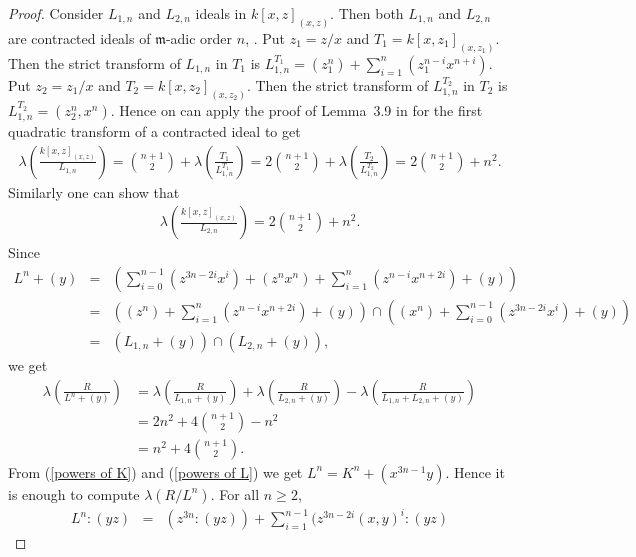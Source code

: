 \documentclass[reqno,a4paper,dvipsnames]{amsart}
\newcommand{\m}{\mathfrak{m} }
\theoremstyle{definition}
\begin{document}
\begin{proof}
    Consider  $L_{1,n}$ and $L_{2,n}$ ideals in $k[x,z]_{(x,z)}$. Then  both $L_{1,n}$ and $L_{2,n}$ are  contracted ideals of $\m$-adic order $n$,
    \cite[Proposition~2.3]{huneke-complete}. Put $z_1 = z/x$ and $T_1= k[x,z_1]_{(x,z_1)}$.
   Then   the strict transform of $L_{1,n}$  in $T_1$ is $L_{1,n}^{T_1} = (z_1 ^n) + \sum_{i=1}^{n} (z_1^{n-i} x^{n+i})$.  Put  $z_2 = z_1/x$ and $T_2= k[x,z_2]_{(x,z_2)}$.
   Then   the strict transform of $L_{1,n}^{T_2}$  in $T_2$ is $L_{1,n}^{T_2} = (z_2^n, x^n)$. 
Hence  on can apply the proof of  Lemma~3.9 in \cite{john-verma} for  the first quadratic transform of a contracted ideal to get
\begin{eqnarray*}
    \lambda \left( \frac{k[x,z]_{(x,z)}}{L_{1,n}}\right) 
=  \binom{n+1}{2} +  \lambda \left( \frac{T_1}{L_{1,n}^{T_1}}\right) 
= 2 \binom{n+1}{2} + \lambda \left( \frac{T_2}{L_{1,n}^{T_2}}\right) 
= 2 \binom{n+1}{2} + n^2.
 \end{eqnarray*}
Similarly one can show that 
 \begin{eqnarray*}
    \lambda \left( \frac{k[x,z]_{(x,z)}}{L_{2,n}}\right) 
     = 2 \binom{n+1}{2} + n^2.
    \end{eqnarray*}
    Since
 \begin{eqnarray}
    \label{formula L^n} \nonumber
  L^n + (y) 
 &=&\left(  \sum_{i=0}^{n-1} (z^{3n-2i} x^i)  + (z^n x^n) 
+     \sum_{i=1}^{n} (z^{n-i} x^{n+2i}) + (y) \right)
     \\ \nonumber
&=& \left(  (z^n)
 +    \sum_{i=1}^{n} (z^{n-i} x^{n+2i}) + (y) \right)
     \cap \left(  (x^n) +  \sum_{i=0}^{n-1} (z^{3n-2i} x^i) + (y) \right)\\ 
  &=&   (L_{1,n} +  (y) ) \cap (L_{2,n} + (y)),
      \end{eqnarray}
we get 
\begin{align}
\label{length ln+y}  \nonumber
    \lambda \left( \frac{R}{L^{n} + (y)} \right) 
    &= \lambda \left( \frac{R}{L_{1,n} + (y)} \right)  
    + \lambda \left( \frac{R}{L_{2,n} + (y)} \right) 
    - \lambda \left( \frac{R}{ L_{1,n} + L_{2,n} + (y)} \right)\\  \nonumber
    &= 2 n^2 + 4\binom{n+1}{2} - n^2\\
    &= n^2 +  4\binom{n+1}{2}.
\end{align}
     From  (\ref{powers of K}) and (\ref{powers of L}) we get $L^n = K^n + (x^{3n-1}y)$. Hence  it is enough to compute $\lambda(R/L^n)$. 
 For all $n \geq 2$,  \normalsize
\begin{eqnarray} \nonumber
     L^n : (yz) 
     &=& (z^{3n} :(yz)) + \sum_{i=1}^{n-1} (z^{3n-2i} (x,y)^{i} : (yz) 

\end{eqnarray}
\end{proof}
\end{document}
